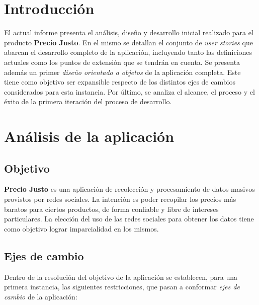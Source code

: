 \documentclass[10pt, a4paper]{article}
\begin{document}
\maketitle
\tableofcontents
\newpage

\section{Introducción}

El actual informe presenta el análisis, diseño y desarrollo inicial realizado para el producto \textbf{Precio Justo}. En el mismo se detallan el conjunto de \emph{user stories} que abarcan el desarrollo completo de la aplicación, incluyendo tanto las definiciones actuales como los puntos de extensión que se tendrán en cuenta. Se presenta además un primer \emph{diseño orientado a objetos} de la aplicación completa. Este tiene como objetivo ser expansible respecto de los distintos ejes de cambios considerados para esta instancia. Por último, se analiza el alcance, el proceso y el éxito de la primera iteración del proceso de desarrollo. 

\section{Análisis de la aplicación}

\subsection{Objetivo}

\textbf{Precio Justo} es una aplicación de recolección y procesamiento de datos masivos provistos por redes sociales. La intención es poder recopilar los precios más baratos para ciertos productos, de forma confiable y libre de intereses particulares. La elección del uso de las redes sociales para obtener los datos tiene como objetivo lograr imparcialidad en los mismos.

\subsection{Ejes de cambio}

Dentro de la resolución del objetivo de la aplicación se establecen, para una primera instancia, las siguientes restricciones, que pasan a conformar \emph{ejes de cambio} de la aplicación:
\end{document}
